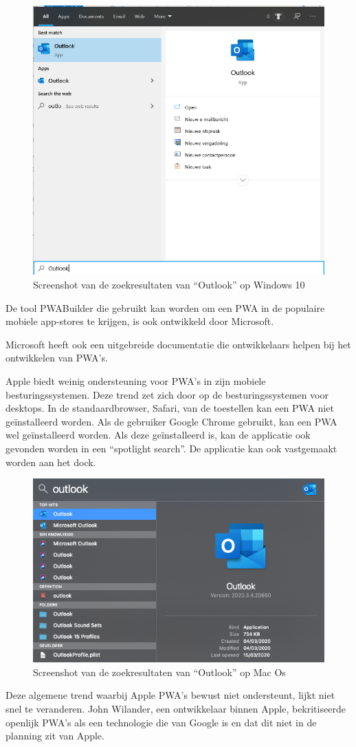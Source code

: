 \begin{figure}
	\centering
	\includegraphics{./img/Outlook_search_windows.png}
	\caption{Screenshot van de zoekresultaten van “Outlook” op Windows 10}
\end{figure}


De tool PWABuilder die gebruikt kan worden om een PWA in de populaire mobiele app-stores te krijgen, is ook ontwikkeld door Microsoft.
\autocite{PWAbuilder2020}

Microsoft heeft ook een uitgebreide documentatie die ontwikkelaars helpen bij het ontwikkelen van PWA’s.
\autocite{Microsoft2020b}


Apple biedt weinig ondersteuning voor PWA’s in zijn mobiele besturingssystemen. Deze trend zet zich door op de besturingssystemen voor desktops. In de standaardbrowser, Safari, van de toestellen kan een PWA niet geïnstalleerd worden. Als de gebruiker Google Chrome gebruikt, kan een PWA wel geïnstalleerd worden. Als deze geïnstalleerd is, kan de applicatie ook gevonden worden in een “spotlight search”. De applicatie kan ook vastgemaakt worden aan het dock.

\begin{figure}
	\centering
	\includegraphics{./img/Outlook_search_mac.png}
	\caption{Screenshot van de zoekresultaten van “Outlook” op Mac Os}
\end{figure}

Deze algemene trend waarbij Apple PWA’s bewust niet ondersteunt, lijkt niet snel te veranderen. John Wilander, een ontwikkelaar binnen Apple, bekritiseerde openlijk PWA’s als een technologie die van Google is en dat dit niet in de planning zit van Apple. 
\autocite{Wilander2019}